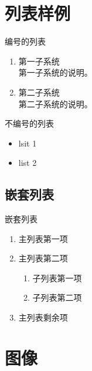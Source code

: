 \documentclass[a4paper,12pt]{article} %
\begin{document}
 
 \section{列表样例}
 编号的列表
 \begin{enumerate}
  \item 第一子系统\\
  第一子系统的说明。
  \item 第二子系统\\
  第二子系统的说明。
 \end{enumerate}

 不编号的列表
 \begin{itemize} %
 \item lsit 1
 \item list 2
 \end{itemize}

 \subsection{嵌套列表}
 嵌套列表
 \begin{enumerate}
 \item 主列表第一项
 \item 主列表第二项
   \begin{enumerate}
   \item 子列表第一项
   \item 子列表第二项
   \end{enumerate}
   \item 主列表剩余项
 \end{enumerate}
 

\section{图像}
\end{document}
